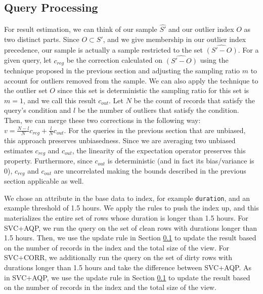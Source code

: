 \subsection{Query Processing}\label{oqp} 
For result estimation, we can think of our sample $\hat{S'}$ and our outlier index $O$ as two distinct parts.
Since $O \subset S'$, and we give membership in our outlier index precedence, our sample is actually a sample restricted to the set $\widehat{(S'-O)}$.   
For a given query, let $c_{reg}$ be the correction calculated on $\widehat{(S'-O)}$ using the technique proposed in the previous section and adjusting the sampling ratio $m$ to account for outliers removed from the sample.
We can also apply the technique to the outlier set $O$ since this set is deterministic the sampling ratio for this set is $m=1$, and we call this result $c_{out}$.
Let $N$ be the count of records that satisfy the query's condition and $l$ be the number of outliers that satisfy the condition.
Then, we can merge these two corrections in the following way:
$
 v = \frac{N-l}{N}c_{reg} + \frac{l}{N}c_{out}
$.
For the queries in the previous section that are unbiased, this approach preserves unbiasedness.
Since we are averaging two unbiased estimates $c_{reg}$ and $c_{out}$, the linearity of the expectation operator preserves this property.
Furthermore, since $c_{out}$ is deterministic (and in fact its bias/variance is 0), $c_{reg}$ and $c_{out}$ are uncorrelated making the bounds described in the previous section applicable as well.

\begin{example}
We chose an attribute in the base data to index, for example \texttt{duration}, and an example threshold of 1.5 hours.
We apply the rules to push the index up, and this materializes the entire set of rows whose duration is longer than 1.5 hours.
For SVC+AQP, we run the query on the set of clean rows with durations longer than 1.5 hours.
Then, we use the update rule in Section \ref{oqp} to update the result based on the number of records in the index and the total size of the view.
For SVC+CORR, we additionally run the query on the set of dirty rows with durations longer than 1.5 hours and take the difference between SVC+AQP.
As in SVC+AQP, we use the update rule in Section \ref{oqp} to update the result based on the number of records in the index and the total size of the view.
\end{example}


